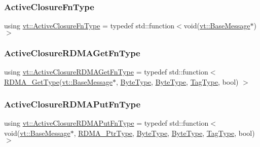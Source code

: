 \mbox{\label{namespacevt_a2a06c34cafcd511828f16cbf1476b924}} 
\subsubsection{\texorpdfstring{Active\+Closure\+Fn\+Type}{ActiveClosureFnType}}
{\footnotesize\ttfamily using \hyperlink{namespacevt_a2a06c34cafcd511828f16cbf1476b924}{vt\+::\+Active\+Closure\+Fn\+Type} = typedef std\+::function$<$void(\hyperlink{namespacevt_ac34f95a5e2b8109b55bfba52b074443d}{vt\+::\+Base\+Message}$\ast$)$>$}

\mbox{\label{namespacevt_aac79af69904337145f4d3d441802c932}} 
\subsubsection{\texorpdfstring{Active\+Closure\+R\+D\+M\+A\+Get\+Fn\+Type}{ActiveClosureRDMAGetFnType}}
{\footnotesize\ttfamily using \hyperlink{namespacevt_aac79af69904337145f4d3d441802c932}{vt\+::\+Active\+Closure\+R\+D\+M\+A\+Get\+Fn\+Type} = typedef std\+::function$<$ \hyperlink{namespacevt_a1cab7f4860f65a49ad2c042d6240f288}{R\+D\+M\+A\+\_\+\+Get\+Type}(\hyperlink{namespacevt_ac34f95a5e2b8109b55bfba52b074443d}{vt\+::\+Base\+Message}$\ast$, \hyperlink{namespacevt_aab8d55968084610ce3b17057981e9300}{Byte\+Type}, \hyperlink{namespacevt_aab8d55968084610ce3b17057981e9300}{Byte\+Type}, \hyperlink{namespacevt_a84ab281dae04a52a4b243d6bf62d0e52}{Tag\+Type}, bool) $>$}

\mbox{\label{namespacevt_ab526cbb2c45e18f3e7ba7d7727e5b0de}} 
\subsubsection{\texorpdfstring{Active\+Closure\+R\+D\+M\+A\+Put\+Fn\+Type}{ActiveClosureRDMAPutFnType}}
{\footnotesize\ttfamily using \hyperlink{namespacevt_ab526cbb2c45e18f3e7ba7d7727e5b0de}{vt\+::\+Active\+Closure\+R\+D\+M\+A\+Put\+Fn\+Type} = typedef std\+::function$<$ void(\hyperlink{namespacevt_ac34f95a5e2b8109b55bfba52b074443d}{vt\+::\+Base\+Message}$\ast$, \hyperlink{namespacevt_a9e2c953286c7616f7c218e9951790776}{R\+D\+M\+A\+\_\+\+Ptr\+Type}, \hyperlink{namespacevt_aab8d55968084610ce3b17057981e9300}{Byte\+Type}, \hyperlink{namespacevt_aab8d55968084610ce3b17057981e9300}{Byte\+Type}, \hyperlink{namespacevt_a84ab281dae04a52a4b243d6bf62d0e52}{Tag\+Type}, bool) $>$}

